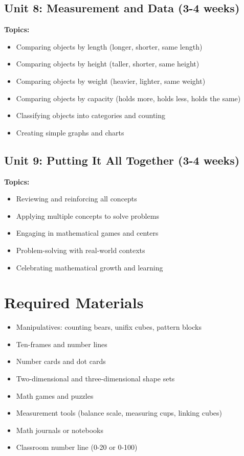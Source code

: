 \documentclass[11pt,letterpaper]{report}
\begin{document}
\subsection{Unit 8: Measurement and Data (3-4 weeks)}

\textbf{Topics:}
\begin{itemize}
    \item Comparing objects by length (longer, shorter, same length)
    \item Comparing objects by height (taller, shorter, same height)
    \item Comparing objects by weight (heavier, lighter, same weight)
    \item Comparing objects by capacity (holds more, holds less, holds the same)
    \item Classifying objects into categories and counting
    \item Creating simple graphs and charts
\end{itemize}

\subsection{Unit 9: Putting It All Together (3-4 weeks)}

\textbf{Topics:}
\begin{itemize}
    \item Reviewing and reinforcing all concepts
    \item Applying multiple concepts to solve problems
    \item Engaging in mathematical games and centers
    \item Problem-solving with real-world contexts
    \item Celebrating mathematical growth and learning
\end{itemize}

\section{Required Materials}

\begin{itemize}
    \item Manipulatives: counting bears, unifix cubes, pattern blocks
    \item Ten-frames and number lines
    \item Number cards and dot cards
    \item Two-dimensional and three-dimensional shape sets
    \item Math games and puzzles
    \item Measurement tools (balance scale, measuring cups, linking cubes)
    \item Math journals or notebooks
    \item Classroom number line (0-20 or 0-100)
\end{itemize}
\end{document}
